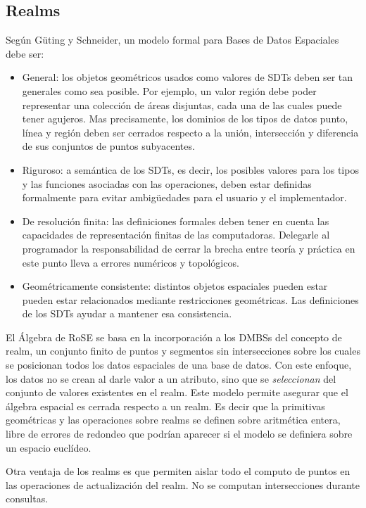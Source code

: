 \subsection{Realms}

Según Güting y Schneider, un modelo formal para Bases de Datos Espaciales debe ser:
\begin{itemize}
    \item General: los objetos geométricos usados como valores de SDTs deben ser tan generales como sea posible. Por ejemplo, un valor región debe poder representar una colección de áreas disjuntas, cada una de las cuales puede tener agujeros. Mas precisamente, los dominios de los tipos de datos punto, línea y región deben ser cerrados respecto a la unión, intersección y diferencia de sus conjuntos de puntos subyacentes.
    \item Riguroso: a semántica de los SDTs, es decir, los posibles valores para los tipos y las funciones asociadas con las operaciones, deben estar definidas formalmente para evitar ambigüedades para el usuario y el implementador.
    \item De resolución finita: las definiciones formales deben tener en cuenta las capacidades de representación finitas de las computadoras. Delegarle al programador la responsabilidad de cerrar la brecha entre teoría y práctica en este punto lleva a errores numéricos y topológicos.
    \item Geométricamente consistente: distintos objetos espaciales pueden estar pueden estar relacionados mediante restricciones geométricas. Las definiciones de los SDTs ayudar a mantener esa consistencia.
\end{itemize}

El Álgebra de RoSE se basa en la incorporación a los DMBSs del concepto de realm, un conjunto finito de puntos y segmentos sin intersecciones sobre los cuales se posicionan todos los datos espaciales de una base de datos. Con este enfoque, los datos no se crean al darle valor a un atributo, sino que se \emph{seleccionan} del conjunto de valores existentes en el realm. Este modelo permite asegurar que el álgebra espacial es cerrada respecto a un realm. Es decir que la primitivas geométricas y las operaciones sobre realms se definen sobre aritmética entera, libre de errores de redondeo que podrían aparecer si el modelo se definiera sobre un espacio euclídeo.

Otra ventaja de los realms es que permiten aislar todo el computo de puntos en las operaciones de actualización del realm. No se computan intersecciones durante consultas.

